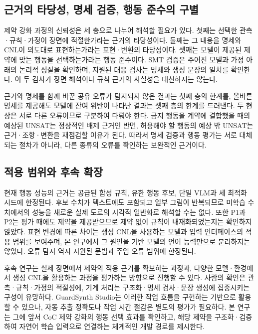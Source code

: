\documentclass[10pt,a4paper,twocolumn]{article}\usepackage[margin=18mm]{geometry}\usepackage{fontspec,kotex}
\begin{document}
\subsection{근거의 타당성, 명세 검증, 행동 준수의 구별}

제약 강화 과정의 신뢰성은 세 층으로 나누어 해석할 필요가 있다. 첫째는 선택한 관측·규칙·가정이 장면에 적절한가라는 근거의 타당성이다. 둘째는 그 내용을 명세와 CNL이 의도대로 표현하는가라는 표현·변환의 타당성이다. 셋째는 모델이 제공된 제약에 맞는 행동을 선택하는가라는 행동 준수이다. SMT 검증은 주어진 모델과 가정 아래의 논리적 성질을 확인하며, 지원된 대응 검사는 명세와 생성 문장의 일치를 확인한다. 이 두 검사가 장면 해석이나 규칙 근거의 사실성을 대신하지는 않는다.\par

근거와 명세를 함께 바꾼 공유 오류가 탐지되지 않은 결과는 첫째 층의 한계를, 올바른 명세를 제공해도 모델에 잔여 위반이 나타난 결과는 셋째 층의 한계를 드러낸다. 두 현상은 서로 다른 오류이므로 구분하여 다뤄야 한다. 금지 행동을 계약에 결합했을 때의 예상된 UNSAT는 정상적인 배제 근거인 반면, 허용해야 할 행동의 예상 밖 UNSAT는 근거·조항·변환을 재점검할 이유가 된다. 따라서 명세 검증과 행동 평가는 서로 대체되는 절차가 아니라, 다른 종류의 오류를 확인하는 보완적인 근거이다.\par

\subsection{적용 범위와 후속 확장}

현재 행동 성능의 근거는 공급된 합성 규칙, 유한 행동 후보, 단일 VLM과 세 최적화 시드에 한정된다. 후보 수치가 텍스트에도 포함되고 일부 그림이 반복되므로 미학습 수치에서의 성능을 새로운 실제 도로의 시각적 일반화로 해석할 수는 없다. 또한 P1과 P2는 평가 때에도 제약을 제공받으므로 제약 없이 규칙이 내재화되었는지는 확인하지 않았다. 표현 변경에 따른 차이는 생성 CNL을 사용하는 모델과 입력 인터페이스의 적용 범위를 보여주며, 본 연구에서 그 원인을 기반 모델의 언어 능력만으로 분리하지는 않았다. 오류 탐지 역시 지원된 문법과 주입 오류 범위에 한정된다.\par

후속 연구는 실제 장면에서 제약의 적용 근거를 확보하는 과정과, 다양한 모델·환경에서 생성 CNL을 활용하는 과정을 평가하는 방향으로 진행할 수 있다. 사람의 확인은 관측·규칙·가정의 적절성에, 기계 처리는 구조화·명세 검사·문장 생성에 집중시키는 구성이 유망하다. GuardSynth Studio는 이러한 작업 흐름을 구현하는 기반으로 활용할 수 있으나, 자동 추출 정확도나 작업 시간 절감은 별도의 평가가 필요하다. 본 연구는 그에 앞서 CoC 제약 강화의 행동 선택 효과를 확인하고, 해당 제약을 구조화·검증하여 자연어 학습 입력으로 연결하는 체계적인 개발 경로를 제시한다.\par
\end{document}
